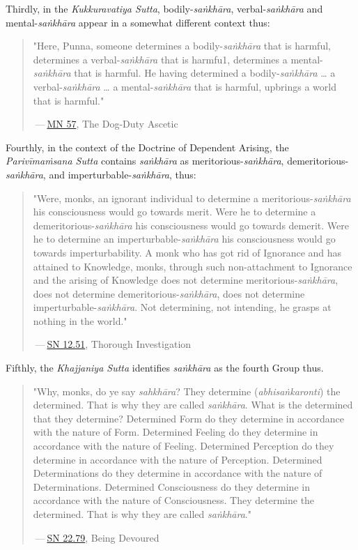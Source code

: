 Thirdly, in the \emph{Kukkuravatiya Sutta}, bodily-\emph{saṅkhāra},
verbal-\emph{saṅkhāra} and mental-\emph{saṅkhāra} appear in a somewhat different
context thus:


\begin{quotation}
"Here, Punna, someone determines a
bodily-\emph{saṅkhāra} that is harmful, determines a verbal-\emph{saṅkhāra}
that is harmfu1, determines a mental-\emph{saṅkhāra} that is harmful. He
having determined a bodily-\emph{saṅkhāra} … a verbal-\emph{saṅkhāra} … a
mental-\emph{saṅkhāra} that is harmful, upbrings a world that is harmful."


 — \href{https://suttacentral.net/mn57/en/bodhi}{MN 57}, The Dog-Duty Ascetic


\end{quotation}

Fourthly, in the context of the Doctrine of Dependent Arising, the
\emph{Parivīmaṁsana Sutta} contains \emph{saṅkhāra} as
meritorious-\emph{saṅkhāra}, demeritorious-\emph{saṅkhāra}, and
imperturbable-\emph{saṅkhāra}, thus:


\begin{quotation}
"Were, monks, an ignorant individual
to determine a meritorious-\emph{saṅkhāra} his consciousness would go
towards merit. Were he to determine a demeritorious-\emph{saṅkhāra} his
consciousness would go towards demerit. Were he to determine an
imperturbable-\emph{saṅkhāra} his consciousness would go towards
imperturbability. A monk who has got rid of Ignorance and has attained
to Knowledge, monks, through such non-attachment to Ignorance and the
arising of Knowledge does not determine meritorious-\emph{saṅkhāra}, does
not determine demeritorious-\emph{saṅkhāra}, does not determine
imperturbable-\emph{saṅkhāra}. Not determining, not intending, he grasps at
nothing in the world."


 — \href{https://suttacentral.net/sn12.51/en/sujato}{SN 12.51}, Thorough Investigation


\end{quotation}

Fifthly, the \emph{Khajjaniya Sutta} identifies \emph{saṅkhāra} as the fourth Group thus.


\begin{quotation}
"Why, monks, do ye say \emph{sahkhāra}? They determine (\emph{abhisaṅkaronti})
the determined. That is why they are called \emph{saṅkhāra}. What is the
determined that they determine? Determined Form do they determine in
accordance with the nature of Form. Determined Feeling do they determine
in accordance with the nature of Feeling. Determined Perception do they
determine in accordance with the nature of Perception. Determined
Determinations do they determine in accordance with the nature of
Determinations. Determined Consciousness do they determine in accordance
with the nature of Consciousness. They determine the determined. That is
why they are called \emph{saṅkhāra}."


 — \href{https://suttacentral.net/sn22.79/en/bodhi}{SN 22.79}, Being Devoured


\end{quotation}

